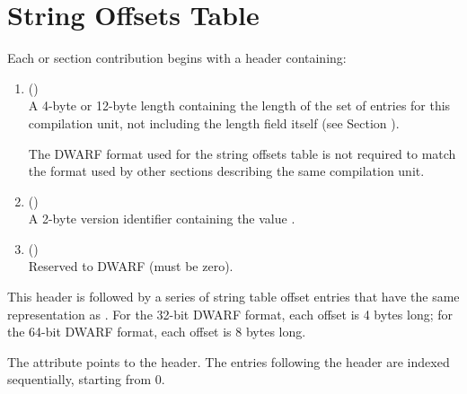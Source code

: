 \section{String Offsets Table}
\label{datarep:stringoffsetstable}
Each 
\bb
\dotdebugstroffsets{} or \dotdebugstroffsetsdwo{} section
contribution
\eb
begins with a header containing:
\begin{enumerate}[1. ]
\item \HFNunitlength{} () \\
A 4-byte or 12-byte length containing the length of
the set of entries for this compilation unit, not
including the length field itself
\bb
(see Section ).
\eb

\bb
The DWARF format used for the string offsets table is not required to match
the format used by other sections describing the same compilation unit.
\eb

\item  \HFNversion{} (\HFTuhalf) \\
A 2-byte version identifier containing the value
\versiondotdebugstroffsets{}.

\item \HFNpadding{} (\HFTuhalf) \\
Reserved to DWARF (must be zero).
\end{enumerate}

This header is followed by a series of string table 
\bb
offset entries
\eb
that have the same representation as \DWFORMstrp.
For the 32-bit DWARF format, each offset is 4 bytes long; for
the 64-bit DWARF format, each offset is 8 bytes long.

The 
\bb
\DWATstroffsets{} attribute points to the header.
\eb
The entries following the header are indexed sequentially,
\db
starting from 0.

